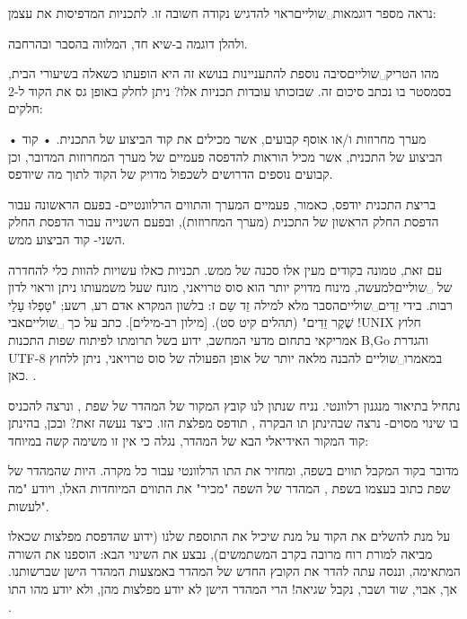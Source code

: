 נראה מספר דוגמאות␣שוליים{ראוי להדגיש נקודה חשובה זו.} לתכניות המדפיסות את עצמן:





ולהלן דוגמה ב-שיא חד, המלווה בהסבר ובהרחבה.

מהו הטריק␣שוליים{סיבה נוספת להתעניינות בנושא זה היא הופעתו כשאלה בשיעורי הבית, בסמסטר בו נכתב סיכום זה.} שבזכותו עובדות תכניות אלו? ניתן לחלק באופן גס את הקוד ל-2 חלקים:
\begin{enumerate}
• מערך מחרוזות ו/או אוסף קבועים, אשר מכילים את קוד הביצוע של התכנית.
• קוד הביצוע של התכנית, אשר מכיל הוראות להדפסה פעמיים של מערך המחרוזות המדובר,
וכן קבועים נוספים הדרושים לשכפול מדויק של הקוד לתוך מה שיודפס.

\end{enumerate}
בריצת התכנית יודפס, כאמור, פעמיים המערך והתווים הרלוונטיים- בפעם הראשונה עבור
הדפסת החלק הראשון של התכנית (מערך המחרוזות), ובפעם השנייה עבור הדפסת החלק השני-
קוד הביצוע ממש.

עם זאת, טמונה בקודים מעין אלו סכנה של ממש. תכניות כאלו עשויות להוות כלי להחדרה
של ␣שוליים{למעשה, מינוח מדויק יותר הוא סוס טרויאני, מונח שעל
משמעותו ניתן וראוי לדון רבות.} בידי זֵדִים␣שוליים{הסבר מלא למילה זֵד שֵם ז:
בלשון המקרא אדם רע, רשע; "טָפְלוּ עָלַי שֶׁקֶר זֵדִים" (תהלים קיט סט). [מילון רב-מילים]}.
כתב על כך ␣שוליים{אבי !UNIX חלוץ אמריקאי בתחום מדעי
המחשב, ידוע בשל תרומתו לפיתוח שפות התכנות B,Go והגדרת UTF-8} במאמרו␣שוליים
{להבנה מלאה יותר של אופן הפעולה של סוס טרויאני, ניתן ללחוץ כאן. }.

נתחיל בתיאור מנגנון רלוונטי. נניח שנתון לנו קובץ המקור של המהדר של שפת ,
ונרצה להכניס בו שינוי מסוים- נרצה שבהינתן תו הבקרה , תודפס מפלצת
 הזו. כיצד נעשה זאת? ובכן, בהינתן קוד המקור האידיאלי הבא של המהדר,
נגלה כי אין זו משימה קשה במיוחד:

מדובר בקוד המקבל תווים בשפה, ומחזיר את התו הרלוונטי עבור כל מקרה. היות שהמהדר
של שפת  כתוב בעצמו בשפת , המהדר של השפה "מכיר" את התווים המיוחדות האלו,
ויודע "מה לעשות".

על מנת להשלים את הקוד על מנת שיכיל את התוספת שלנו (ידוע שהדפסת מפלצות
 שכאלו מביאה למורת רוח מרובה בקרב המשתמשים), נבצע את השינוי הבא:
הוספנו את השורה המתאימה, וננסה עתה להדר את הקובץ החדש של המהדר באמצעות המהדר
הישן שברשותנו. אך, אבוי, שוד ושבר, נקבל שגיאה! הרי המהדר הישן לא יודע מפלצות
 מהן, ולא יודע מהו התו .

